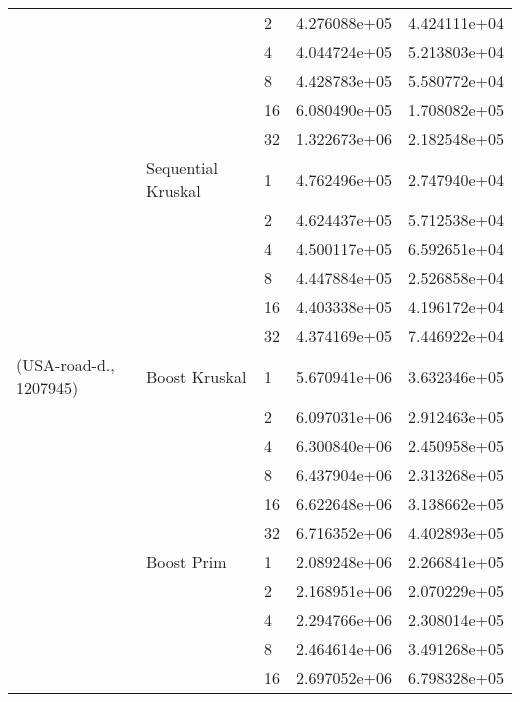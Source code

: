 \begin{tabular}{lllrr}
                       &                    & 2  &  4.276088e+05 &  4.424111e+04 \\
                       &                    & 4  &  4.044724e+05 &  5.213803e+04 \\
                       &                    & 8  &  4.428783e+05 &  5.580772e+04 \\
                       &                    & 16 &  6.080490e+05 &  1.708082e+05 \\
                       &                    & 32 &  1.322673e+06 &  2.182548e+05 \\
                       & Sequential Kruskal & 1  &  4.762496e+05 &  2.747940e+04 \\
                       &                    & 2  &  4.624437e+05 &  5.712538e+04 \\
                       &                    & 4  &  4.500117e+05 &  6.592651e+04 \\
                       &                    & 8  &  4.447884e+05 &  2.526858e+04 \\
                       &                    & 16 &  4.403338e+05 &  4.196172e+04 \\
                       &                    & 32 &  4.374169e+05 &  7.446922e+04 \\
(USA-road-d., 1207945) & Boost Kruskal & 1  &  5.670941e+06 &  3.632346e+05 \\
                       &                    & 2  &  6.097031e+06 &  2.912463e+05 \\
                       &                    & 4  &  6.300840e+06 &  2.450958e+05 \\
                       &                    & 8  &  6.437904e+06 &  2.313268e+05 \\
                       &                    & 16 &  6.622648e+06 &  3.138662e+05 \\
                       &                    & 32 &  6.716352e+06 &  4.402893e+05 \\
                       & Boost Prim & 1  &  2.089248e+06 &  2.266841e+05 \\
                       &                    & 2  &  2.168951e+06 &  2.070229e+05 \\
                       &                    & 4  &  2.294766e+06 &  2.308014e+05 \\
                       &                    & 8  &  2.464614e+06 &  3.491268e+05 \\
                       &                    & 16 &  2.697052e+06 &  6.798328e+05 \\

\end{tabular}
